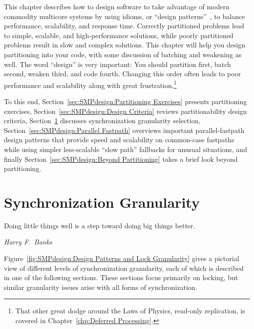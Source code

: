 
%

This chapter describes how to design software to take advantage of
modern commodity multicore systems by using idioms, or
``design patterns''~\cite{Alexander79,GOF95,SchmidtStalRohnertBuschmann2000v2Textbook},
to balance performance, scalability, and response time.
Correctly partitioned problems lead to simple, scalable, and
high-performance solutions, while poorly partitioned problems result
in slow and complex solutions.
This chapter will help you design partitioning into your code, with
some discussion of batching and weakening as well.
The word ``design'' is very important: You should partition first,
batch second, weaken third, and code fourth.
Changing this order often leads to poor performance and scalability
along with great frustration.\footnote{
	That other great dodge around the Laws of Physics, read-only
	replication, is covered in Chapter~\ref{chp:Deferred Processing}.}

To this end, Section~\ref{sec:SMPdesign:Partitioning Exercises}
presents partitioning exercises,
Section~\ref{sec:SMPdesign:Design Criteria} reviews partitionability
design criteria,
Section~\ref{sec:SMPdesign:Synchronization Granularity}
discusses synchronization granularity selection,
Section~\ref{sec:SMPdesign:Parallel Fastpath}
overviews important parallel-fastpath design patterns
that provide speed and scalability on common-case fastpaths while using
simpler less-scalable ``slow path'' fallbacks for unusual situations,
and finally
Section~\ref{sec:SMPdesign:Beyond Partitioning}
takes a brief look beyond partitioning.





\section{Synchronization Granularity}
\label{sec:SMPdesign:Synchronization Granularity}
%
\epigraph{Doing little things well is a step toward doing big things better.}
	 {\emph{Harry F.~Banks}}

Figure~\ref{fig:SMPdesign:Design Patterns and Lock Granularity}
gives a pictorial view of different levels of synchronization granularity,
each of which is described in one of the following sections.
These sections focus primarily on locking, but similar granularity
issues arise with all forms of synchronization.

